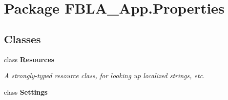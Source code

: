 \hypertarget{namespace_f_b_l_a___app_1_1_properties}{\section{Package F\+B\+L\+A\+\_\+\+App.\+Properties}
\label{namespace_f_b_l_a___app_1_1_properties}
}
\subsection*{Classes}
\begin{DoxyCompactItemize}
\item 
class {\bfseries Resources}
\begin{DoxyCompactList}\small\item\em A strongly-\/typed resource class, for looking up localized strings, etc. \end{DoxyCompactList}\item 
class {\bfseries Settings}
\end{DoxyCompactItemize}
